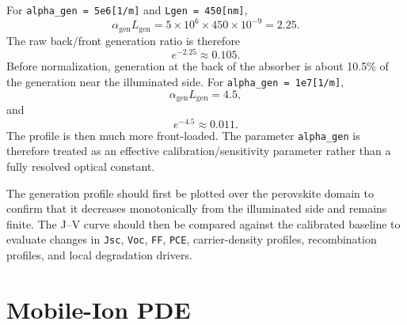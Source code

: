 For \texttt{alpha\_gen = 5e6[1/m]} and
\texttt{Lgen = 450[nm]},
\begin{equation}
\alpha_{\mathrm{gen}}L_{\mathrm{gen}}
=5\times10^6 \times 450\times10^{-9}=2.25.
\end{equation}
The raw back/front generation ratio is therefore
\begin{equation}
e^{-2.25}\approx0.105.
\end{equation}
Before normalization, generation at the back of the absorber is about 10.5\%
of the generation near the illuminated side. For
\texttt{alpha\_gen = 1e7[1/m]},
\begin{equation}
\alpha_{\mathrm{gen}}L_{\mathrm{gen}}=4.5,
\end{equation}
and
\begin{equation}
e^{-4.5}\approx0.011.
\end{equation}
The profile is then much more front-loaded. The parameter
\texttt{alpha\_gen} is therefore treated as an effective
calibration/sensitivity parameter rather than a fully resolved optical
constant.

The generation profile should first be plotted over the perovskite domain to
confirm that it decreases monotonically from the illuminated side and remains
finite. The J--V curve should then be compared against the calibrated baseline
to evaluate changes in \texttt{Jsc}, \texttt{Voc}, \texttt{FF}, \texttt{PCE},
carrier-density profiles, recombination profiles, and local degradation
drivers.

\section{Mobile-Ion PDE}

